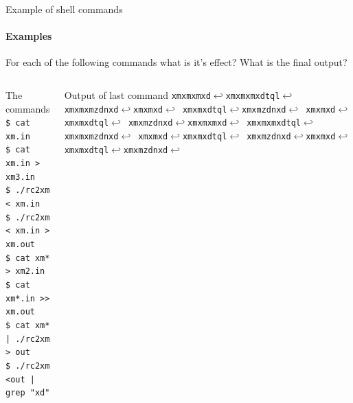 \begin{frame}{Example of shell commands}
\framesubtitle{Examples}
For each of the following commands what is it's effect? What is the final output?
\vspace{-.2in}
\begin{columns}
	\begin{block}{The commands}
		\texttt{\$ cat xm.in}\\
		\texttt{\$ cat xm.in > xm3.in}\\
		\texttt{\$ ./rc2xm < xm.in}\\
		\texttt{\$ ./rc2xm < xm.in > xm.out}\\
		\texttt{\$ cat xm* > xm2.in}\\
		\texttt{\$ cat xm*.in >> xm.out}\\
		\texttt{\$ cat xm* | ./rc2xm > out}\\
		\texttt{\$ ./rc2xm <out | grep "xd"}
	\end{block}
	\begin{block}{Output of last command}
	\texttt{xmxmxmxd$\hookleftarrow$xmxmxmxdtql$\hookleftarrow$
xmxmxmzdnxd$\hookleftarrow$xmxmxd$\hookleftarrow$
xmxmxdtql$\hookleftarrow$xmxmzdnxd$\hookleftarrow$
xmxmxd$\hookleftarrow$xmxmxdtql$\hookleftarrow$
xmxmzdnxd$\hookleftarrow$xmxmxmxd$\hookleftarrow$
xmxmxmxdtql$\hookleftarrow$xmxmxmzdnxd$\hookleftarrow$
xmxmxd$\hookleftarrow$xmxmxdtql$\hookleftarrow$
xmxmzdnxd$\hookleftarrow$xmxmxd$\hookleftarrow$
xmxmxdtql$\hookleftarrow$xmxmzdnxd$\hookleftarrow$}
	\end{block}
\end{columns}
\end{frame}

